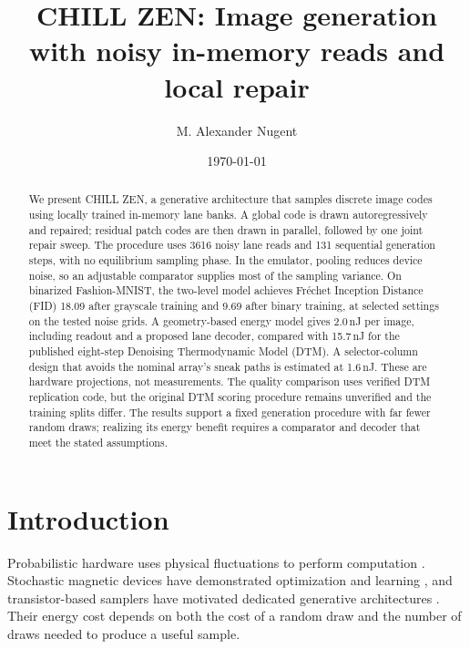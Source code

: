 \documentclass[reprint,amsmath,amssymb,aps,pra,floatfix,nofootinbib]{revtex4-2}
\begin{document}
\raggedbottom
{}
\title{CHILL ZEN: Image generation with noisy in-memory reads and local repair}
\author{M. Alexander Nugent}
\date{\today}

\begin{abstract}
We present CHILL ZEN, a generative architecture that samples discrete image codes using locally trained in-memory lane banks. A global code is drawn autoregressively and repaired; residual patch codes are then drawn in parallel, followed by one joint repair sweep. The procedure uses 3616 noisy lane reads and 131 sequential generation steps, with no equilibrium sampling phase. In the emulator, pooling reduces device noise, so an adjustable comparator supplies most of the sampling variance. On binarized Fashion-MNIST, the two-level model achieves Fr\'echet Inception Distance (FID) 18.09 after grayscale training and 9.69 after binary training, at selected settings on the tested noise grids. A geometry-based energy model gives 2.0\,nJ per image, including readout and a proposed lane decoder, compared with 15.7\,nJ for the published eight-step Denoising Thermodynamic Model (DTM). A selector-column design that avoids the nominal array's sneak paths is estimated at 1.6\,nJ. These are hardware projections, not measurements. The quality comparison uses verified DTM replication code, but the original DTM scoring procedure remains unverified and the training splits differ. The results support a fixed generation procedure with far fewer random draws; realizing its energy benefit requires a comparator and decoder that meet the stated assumptions.
\end{abstract}
\maketitle

\section{Introduction}
Probabilistic hardware uses physical fluctuations to perform computation \cite{conte2019thermodynamic}. Stochastic magnetic devices have demonstrated optimization and learning \cite{sutton2017intrinsic,borders2019integer,niazi2024training}, and transistor-based samplers have motivated dedicated generative architectures \cite{jelincic2025dtm,freitas2025taming}. Their energy cost depends on both the cost of a random draw and the number of draws needed to produce a useful sample.
\end{document}
